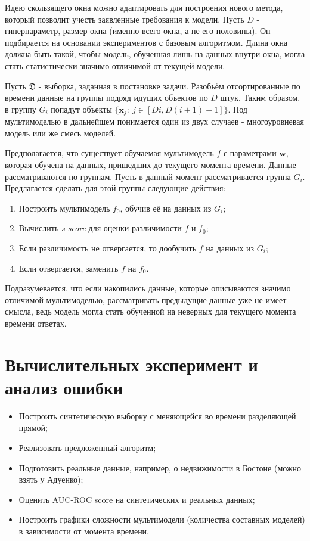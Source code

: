 \documentclass[12pt,twoside]{article}
\begin{document}
Идею скользящего окна можно адаптировать для построения нового метода, который позволит учесть заявленные требования к модели. Пусть $D$ - гиперпараметр, размер окна (именно всего окна, а не его половины). Он подбирается на основании экспериментов с базовым алгоритмом. Длина окна должна быть такой, чтобы модель, обученная лишь на данных внутри окна, могла стать статистически значимо отличимой от текущей модели.

Пусть $\mathfrak{D}$ - выборка, заданная в постановке задачи. Разобьём отсортированные по времени данные на группы подряд идущих объектов по $D$ штук. Таким образом, в группу $G_i$ попадут объекты $\{\mathbf{x}_{j}:\ j \in [Di, D(i + 1) - 1]\}$. Под мультимоделью в дальнейшем понимается один из двух случаев - многоуровневая модель или же смесь моделей.

Предполагается, что существует обучаемая мультимодель $f$ с параметрами $\mathbf{w}$, которая обучена на данных, пришедших до текущего момента времени. Данные рассматриваются по группам. Пусть в данный момент рассматривается группа $G_i$. Предлагается сделать для этой группы следующие действия:

\begin{enumerate}
\item Построить мультимодель $f_0$, обучив её на данных из $G_i$;
\item Вычислить \emph{s-score} для оценки различимости $f$ и $f_0$;
\item Если различимость не отвергается, то дообучить $f$ на данных из $G_i$;
\item Если отвергается, заменить $f$ на $f_0$.
\end{enumerate}

Подразумевается, что если накопились данные, которые описываются значимо отличимой мультимоделью, рассматривать предыдущие данные уже не имеет смысла, ведь модель могла стать обученной на неверных для текущего момента времени ответах.

\section {Вычислительных эксперимент и анализ ошибки}

\begin{itemize}
\item Построить синтетическую выборку с меняющейся во времени разделяющей прямой;
\item Реализовать предложенный алгоритм;
\item Подготовить реальные данные, например, о недвижимости в Бостоне (можно взять у Адуенко);
\item Оценить AUC-ROC score на синтетических и реальных данных;
\item Построить графики сложности мультимодели (количества составных моделей) в зависимости от момента времени.
\end{itemize}
\end{document}
